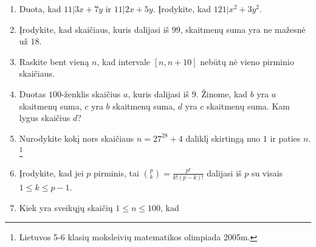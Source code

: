 \begin{enumerate}
  \item Duota, kad $11|3x+7y$ ir $11|2x+5y$.  Įrodykite, kad
    $121|x^2+3y^2$.  
  \item Įrodykite, kad skaičiaus, kuris dalijasi iš $99$, skaitmenų suma
    yra ne mažesnė už $18$.  
  \item Raskite bent vieną $n$, kad intervale $[n,n+10]$ nebūtų nė vieno
    pirminio skaičiaus.  
 \item Duotas $100$-ženklis skaičius $a$, kuris dalijasi iš $9$.  Žinome,
    kad $b$ yra $a$ skaitmenų suma, $c$ yra $b$ skaitmenų suma, $d$ yra $c$
    skaitmenų suma. Kam lygus skaičius $d$?
  \item Nurodykite kokį nors skaičiaus $n = 27^{28} + 4$ daliklį skirtingą
    nuo $1$ ir paties $n$. \footnote{Lietuvos 5-6 klasių moksleivių
    matematikos olimpiada 2005m.} 
  \item Įrodykite, kad jei $p$ pirminis, tai $\binom{p}{k} =
    \frac{p!}{k!(p-k)!}$ dalijasi iš $p$ su visais $1\leq k \leq p-1$.
  \item Kiek yra sveikųjų skaičių $1\leq n \leq 100$, kad 


\end{enumerate}
